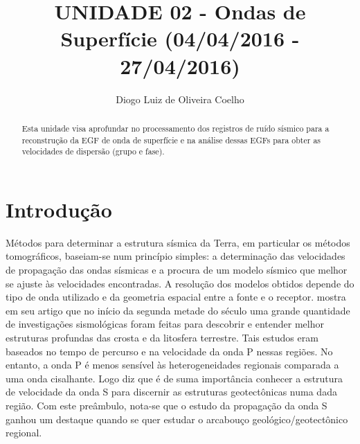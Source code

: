 \documentclass[paper,twocolumn]{geophysics}
\begin{document}
\title{{UNIDADE 02 - Ondas de Superfície (04/04/2016 - 27/04/2016)}}

\address{\footnotemark[1] Universidade Federal do Rio Grande do Norte - UFRN
Centro de Ciências Exatas e da Terra - CCET
Departamento de Geofísica
Campus Universitário - Lagoa Nova
59072-970 Natal, RN
}
\author{Diogo Luiz de Oliveira Coelho\footnotemark[1]}


\begin{abstract}
{Esta unidade visa aprofundar no processamento dos registros de ruído sísmico para a reconstrução da EGF de onda de superfície e na análise dessas EGFs para obter as velocidades de dispersão (grupo e fase).}  
\end{abstract}

\section*{Introdução}

Métodos para determinar a estrutura sísmica da Terra, em particular os métodos tomográficos, baseiam-se num princípio simples: a determinação das velocidades de propagação das ondas sísmicas e a procura de um modelo sísmico que melhor se ajuste às velocidades encontradas. A resolução dos modelos obtidos depende do tipo de onda utilizado e da geometria espacial entre a fonte e o receptor. \cite{levshin_peculiarities_1992} mostra em seu artigo que no início da segunda metade do século uma grande quantidade de investigações sismológicas foram feitas para descobrir e entender melhor estruturas profundas das crosta e da litosfera terrestre. Tais estudos eram baseados no tempo de percurso e na velocidade  da onda P nessas regiões. No entanto, a onda P é menos sensível às heterogeneidades regionais comparada a uma onda cisalhante. Logo \cite{levshin_peculiarities_1992} diz que é de suma importância conhecer a estrutura de velocidade da onda S para discernir as estruturas geotectônicas numa dada região. Com este preâmbulo, nota-se que o estudo da propagação da onda S ganhou um destaque quando se quer estudar o arcabouço geológico/geotectônico regional.
\end{document}
